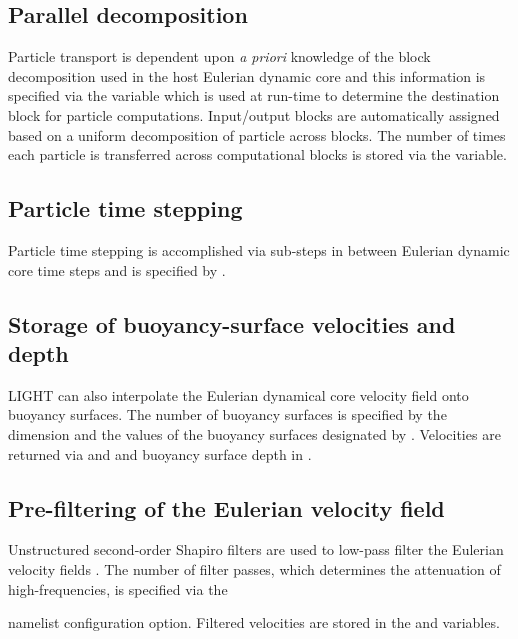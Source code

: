 \subsection{Parallel decomposition}

Particle transport is dependent upon {\it a priori} knowledge of the block
decomposition used in the host Eulerian dynamic core and this information is
specified via the  variable which is used at run-time to
determine the destination block for particle computations.  Input/output blocks
are automatically assigned based on a uniform decomposition of particle across blocks.
The number of times each particle is transferred across computational blocks is 
stored via the  variable.

\subsection{Particle time stepping}

Particle time stepping is accomplished via sub-steps in between Eulerian dynamic core time steps
and is specified by .  

\subsection{Storage of buoyancy-surface velocities and depth}

LIGHT can also interpolate the Eulerian dynamical core velocity field onto buoyancy surfaces.
The number of buoyancy surfaces is specified by the dimension  and 
the values of the buoyancy surfaces designated by .  Velocities are 
returned via  and  and 
buoyancy surface depth in .

\subsection{Pre-filtering of the Eulerian velocity field}

Unstructured second-order Shapiro filters are used to low-pass filter the Eulerian velocity fields 
\citep{Wolfram_di15jpo, wolfram2013mitigating}.  The number of filter passes, which determines the 
attenuation of high-frequencies, is specified via the 

{\noindent}  namelist configuration option.  Filtered velocities are stored in the  and 
variables.

